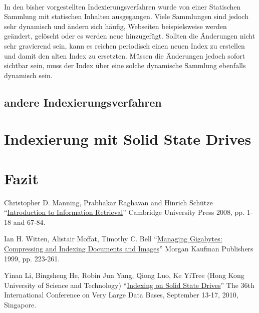 \paragraph{}
In den bisher vorgestellten Indexierungsverfahren wurde von einer Statischen Sammlung mit statischen Inhalten ausgegangen. Viele Sammlungen sind jedoch sehr dynamisch und ändern sich häufig, Webseiten beispielsweise werden geändert, gelöscht oder es werden neue hinzugefügt. Sollten die Änderungen nicht sehr gravierend sein, kann es reichen periodisch einen neuen Index zu erstellen und damit den alten Index zu ersetzten. Müssen die Änderungen jedoch sofort sichtbar sein, muss der Index über eine solche dynamische Sammlung ebenfalls dynamisch sein.\par

\paragraph{}


\subsection{andere Indexierungsverfahren}

\section{Indexierung mit Solid State Drives} \label{indexSSD}

\section{Fazit}

\begin{thebibliography}{9}

		Christopher D. Manning, Prabhakar Raghavan and Hinrich Schütze \enquote{\href{https://nlp.stanford.edu/IR-book/pdf/04const.pdf}{Introduction to Information Retrieval}}  Cambridge University Press 2008, pp. 1-18 and 67-84.

	  Ian H. Witten, Alistair Moffat, Timothy C. Bell \enquote{\href{https://books.google.de/books?id=2F74jyPl48EC&dq=Witten+et+al.+index+1999&lr=&hl=de&source=gbs_navlinks_s}{Managing Gigabytes: Compressing and Indexing Documents and Images}}  Morgan Kaufman Publishers 1999, pp. 223-261.
	
	Yinan Li, Bingsheng He, Robin Jun Yang, Qiong Luo, Ke YiTree (Hong Kong University of Science and Technology) \enquote{\href{http://pages.cs.wisc.edu/~yinan/paper/fdtree_pvldb.pdf}{Indexing on Solid State Drives}} The 36th International Conference on Very Large Data Bases, September 13-17,
2010, Singapore.
\end{thebibliography}

